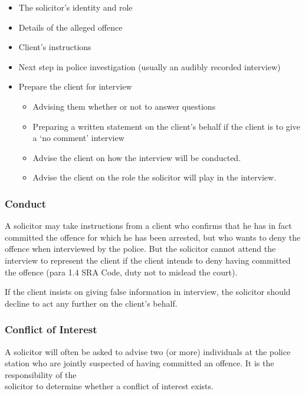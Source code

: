 \documentclass[
]{article}
\providecommand{\tightlist}{%
  \setlength{\itemsep}{0pt}\setlength{\parskip}{0pt}}
\begin{document}
\begin{itemize}
\tightlist
\item
  The solicitor's identity and role
\item
  Details of the alleged offence
\item
  Client's instructions
\item
  Next step in police investigation (usually an audibly recorded
  interview)
\item
  Prepare the client for interview

  \begin{itemize}
  \tightlist
  \item
    Advising them whether or not to answer questions
  \item
    Preparing a written statement on the client's behalf if the client
    is to give a `no comment' interview
  \item
    Advise the client on how the interview will be conducted.
  \item
    Advise the client on the role the solicitor will play in the
    interview.
  \end{itemize}
\end{itemize}

\hypertarget{conduct}{%
\subsubsection{Conduct}\label{conduct}}

A solicitor may take instructions from a client who confirms that he has
in fact committed the offence for which he has been arrested, but who
wants to deny the offence when interviewed by the police. But the
solicitor cannot attend the interview to represent the client if the
client intends to deny having committed the offence (para 1.4 SRA Code,
duty not to mislead the court).

If the client insists on giving false information in interview, the
solicitor should decline to act any further on the client's behalf.

\hypertarget{conflict-of-interest}{%
\subsubsection{Conflict of Interest}\label{conflict-of-interest}}

A solicitor will often be asked to advise two (or more) individuals at
the police station who are jointly suspected of having committed an
offence. It is the responsibility of the\\
solicitor to determine whether a conflict of interest exists.
\end{document}
